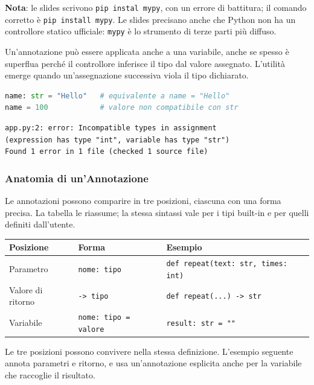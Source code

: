 \documentclass[12pt]{extarticle}
\begin{document}
\noindent \textbf{Nota}: le slides scrivono \texttt{pip instal mypy}, con un errore di battitura; il comando corretto è \texttt{pip install mypy}. Le slides precisano anche che Python non ha un controllore statico ufficiale: \texttt{mypy} è lo strumento di terze parti più diffuso.

\noindent Un'annotazione può essere applicata anche a una variabile, anche se spesso è superflua perché il controllore inferisce il tipo dal valore assegnato. L'utilità emerge quando un'assegnazione successiva viola il tipo dichiarato.

\begin{lstlisting}[language=Python]
name: str = "Hello"   # equivalente a name = "Hello"
name = 100            # valore non compatibile con str
\end{lstlisting}

\begin{lstlisting}[numbers=none]
app.py:2: error: Incompatible types in assignment
(expression has type "int", variable has type "str")
Found 1 error in 1 file (checked 1 source file)
\end{lstlisting}

\subsubsection{Anatomia di un'Annotazione}

\noindent Le annotazioni possono comparire in tre posizioni, ciascuna con una forma precisa. La tabella le riassume; la stessa sintassi vale per i tipi built-in e per quelli definiti dall'utente.

\begin{center}
\small
\begin{tabular}{p{3.0cm}p{4.4cm}p{6.8cm}}
    \toprule
    \textbf{Posizione} & \textbf{Forma} & \textbf{Esempio} \\
    \midrule
    Parametro & \texttt{nome: tipo} & \texttt{def repeat(text: str, times: int)} \\
    \addlinespace
    Valore di ritorno & \texttt{-> tipo} & \texttt{def repeat(...) -> str} \\
    \addlinespace
    Variabile & \texttt{nome: tipo = valore} & \texttt{result: str = ""} \\
    \bottomrule
\end{tabular}
\end{center}

\noindent Le tre posizioni possono convivere nella stessa definizione. L'esempio seguente annota parametri e ritorno, e usa un'annotazione esplicita anche per la variabile che raccoglie il risultato.
\end{document}
